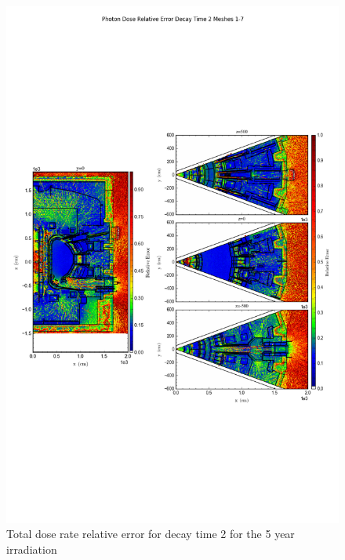 \documentclass[12pt]{article}
\begin{document}
\begin{figure}[ht!]
\centering
\includegraphics[trim={0cm 8cm, 0cm 8cm},clip,scale=0.75]{../plots/final_model_with_b4c/5year/Photon_Dose_Relative_Error_Decay_Time_2_Meshes_1-7.png}
\caption{Total dose rate relative error for decay time 2 for the 5 year irradiation}
\label{fig:photons_5y_dc2_b4c_relerr}
\end{figure}
\clearpage
\end{document}
